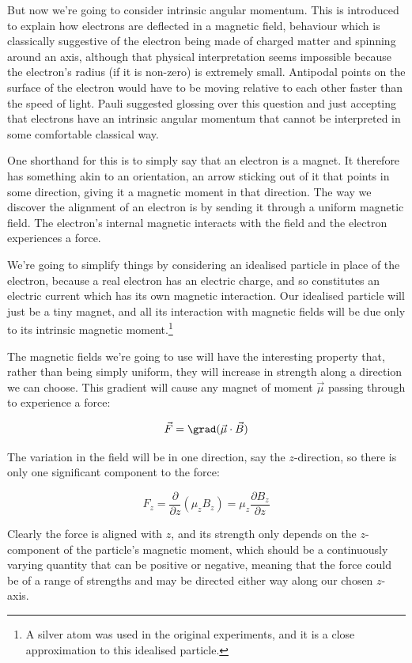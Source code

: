 But now we're going to consider intrinsic angular momentum. This is introduced to explain how electrons are deflected in a magnetic field, behaviour which is classically suggestive of the electron being made of charged matter and spinning around an axis, although that physical interpretation seems impossible because the electron's radius (if it is non-zero) is extremely small. Antipodal points on the surface of the electron would have to be moving relative to each other faster than the speed of light. Pauli suggested glossing over this question and just accepting that electrons have an intrinsic angular momentum that cannot be interpreted in some comfortable classical way.

One shorthand for this is to simply say that an electron is a magnet. It therefore has something akin to an orientation, an arrow sticking out of it that points in some direction, giving it a magnetic moment in that direction. The way we discover the alignment of an electron is by sending it through a uniform magnetic field. The electron's internal magnetic interacts with the field and the electron experiences a force.

We're going to simplify things by considering an idealised particle in place of the electron, because a real electron has an electric charge, and so constitutes an electric current which has its own magnetic interaction. Our idealised particle will just be a tiny magnet, and all its interaction with magnetic fields will be due only to its intrinsic magnetic moment.\footnote{A silver atom was used in the original experiments, and it is a close approximation to this idealised particle.}

The magnetic fields we're going to use will have the interesting property that, rather than being simply uniform, they will increase in strength along a direction we can choose. This gradient will cause any magnet of moment $\vec{\mu}$ passing through to experience a force:

$$
\vec{F} = \grad(\vec{\mu} \cdot \vec{B})
$$

The variation in the field will be in one direction, say the $z$-direction, so there is only one significant component to the force:

$$
F_z = \frac{\partial}{\partial z}(\mu_z B_z)
= \mu_z \frac{\partial B_z}{\partial z}
$$

Clearly the force is aligned with $z$, and its strength only depends on the $z$-component of the particle's magnetic moment, which should be a continuously varying quantity that can be positive or negative, meaning that the force could be of a range of strengths and may be directed either way along our chosen $z$-axis.

